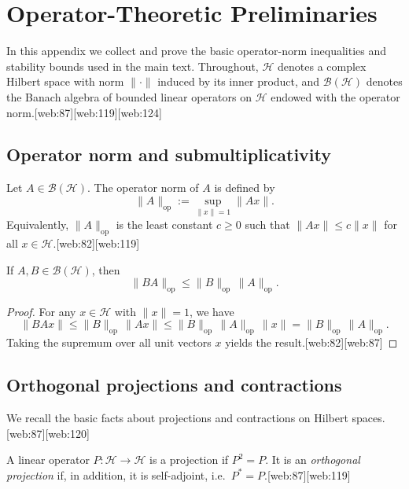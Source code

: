 \documentclass[11pt]{article}
\begin{document}
\section{Operator-Theoretic Preliminaries}

In this appendix we collect and prove the basic operator-norm inequalities and stability bounds used in the main text. Throughout, \( \mathcal{H} \) denotes a complex Hilbert space with norm \( \|\cdot\| \) induced by its inner product, and \( \mathcal{B}(\mathcal{H}) \) denotes the Banach algebra of bounded linear operators on \( \mathcal{H} \) endowed with the operator norm.[web:87][web:119][web:124]

\subsection{Operator norm and submultiplicativity}

\begin{definition}
Let \( A \in \mathcal{B}(\mathcal{H}) \). The operator norm of \( A \) is defined by
\[
\|A\|_{\mathrm{op}} := \sup_{\|x\| = 1} \|Ax\|.
\]
Equivalently, \( \|A\|_{\mathrm{op}} \) is the least constant \( c \ge 0 \) such that \( \|Ax\| \le c\|x\| \) for all \( x \in \mathcal{H} \).[web:82][web:119]
\end{definition}

\begin{lemma}[Submultiplicativity]\label{lem:submult}
If \( A,B \in \mathcal{B}(\mathcal{H}) \), then
\[
\|BA\|_{\mathrm{op}} \le \|B\|_{\mathrm{op}} \, \|A\|_{\mathrm{op}}.
\]
\end{lemma}

\begin{proof}
For any \( x \in \mathcal{H} \) with \( \|x\| = 1 \), we have
\[
\|BAx\| \le \|B\|_{\mathrm{op}} \, \|Ax\| \le \|B\|_{\mathrm{op}} \, \|A\|_{\mathrm{op}} \, \|x\|
= \|B\|_{\mathrm{op}} \, \|A\|_{\mathrm{op}}.
\]
Taking the supremum over all unit vectors \( x \) yields the result.[web:82][web:87]
\end{proof}

\subsection{Orthogonal projections and contractions}

We recall the basic facts about projections and contractions on Hilbert spaces.[web:87][web:120]

\begin{definition}[Projection]
A linear operator \( P:\mathcal{H} \to \mathcal{H} \) is a projection if \( P^2 = P \). It is an \emph{orthogonal projection} if, in addition, it is self-adjoint, i.e.\ \( P^\ast = P \).[web:87][web:119]
\end{definition}
\end{document}
